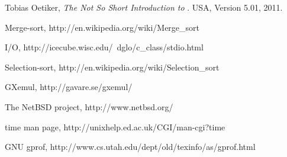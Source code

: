 \begin{thebibliography}{9}

      Tobias Oetiker,
      \emph{The Not So Short Introduction to \LaTeXe}.
      USA,
      Version 5.01,
      2011.

      Merge-sort, \textrm{http://en.wikipedia.org/wiki/Merge\_sort}

      I/O, \textrm{http://icecube.wisc.edu/~dglo/c\_class/stdio.html}

      Selection-sort, \textrm{http://en.wikipedia.org/wiki/Selection\_sort}

      GXemul, \textrm{http://gavare.se/gxemul/}

      The NetBSD project, \textup{http://www.netbsd.org/}

      time man page, \textrm{http://unixhelp.ed.ac.uk/CGI/man-cgi?time}

      GNU gprof, \textrm{http://www.cs.utah.edu/dept/old/texinfo/as/gprof.html} 


\end{thebibliography}

          
